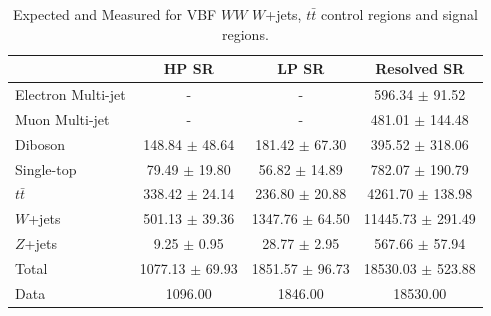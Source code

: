 \begin{table}
\begin{tabular}{|l|c|c|c|}
\hline
	  &	 HP SR &	 LP SR &	Resolved SR \\\hline 
	Electron Multi-jet &	- &	- &	596.34 $\pm$ 91.52 \\\hline 
	Muon Multi-jet &	- &	- &	481.01 $\pm$ 144.48 \\\hline 
	Diboson &	148.84 $\pm$ 48.64 &	181.42 $\pm$ 67.30 &	395.52 $\pm$ 318.06 \\\hline 
	Single-top &	79.49 $\pm$ 19.80 &	56.82 $\pm$ 14.89 &	782.07 $\pm$ 190.79 \\\hline 
	$t\bar{t}$ &	338.42 $\pm$ 24.14 &	236.80 $\pm$ 20.88 &	4261.70 $\pm$ 138.98 \\\hline 
	$W$+jets &	501.13 $\pm$ 39.36 &	1347.76 $\pm$ 64.50 &	11445.73 $\pm$ 291.49 \\\hline 
	$Z$+jets &	9.25 $\pm$ 0.95 &	28.77 $\pm$ 2.95 &	567.66 $\pm$ 57.94 \\\hline 
	Total &	1077.13 $\pm$ 69.93 &	1851.57 $\pm$ 96.73 &	18530.03 $\pm$ 523.88 \\\hline 
	Data &	1096.00 &	1846.00 &	18530.00 \\\hline 
\end{tabular}
\caption{Expected and Measured for VBF $WW$ $W$+jets, $t\bar{t}$ control regions and signal regions.}
\label{tbl:hvtwvbf_yields_tcr}
\end{table}

